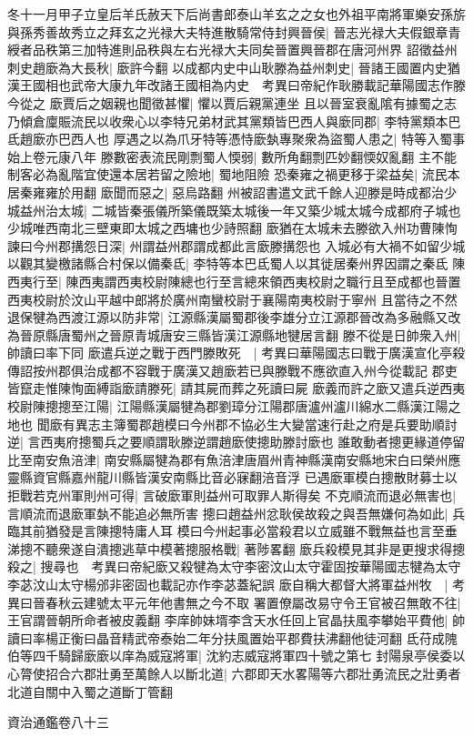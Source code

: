 冬十一月甲子立皇后羊氏赦天下后尚書郎泰山羊玄之之女也外祖平南將軍樂安孫旂與孫秀善故秀立之拜玄之光禄大夫特進散騎常侍封興晉侯|{
	晉志光禄大夫假銀章青綬者品秩第三加特進則品秩與左右光禄大夫同矣晉置興晉郡在唐河州界}
詔徵益州刺史趙廞為大長秋|{
	廞許今翻}
以成都内史中山耿滕為益州刺史|{
	晉諸王國置内史猶漢王國相也武帝大康九年改諸王國相為内史　考異曰帝紀作耿勝載記華陽國志作滕今從之}
廞賈后之姻親也聞徵甚懼|{
	懼以賈后親黨連坐}
且以晉室衰亂隂有據蜀之志乃傾倉廩賑流民以收衆心以李特兄弟材武其黨類皆巴西人與廞同郡|{
	李特黨類本巴氐趙廞亦巴西人也}
厚遇之以為爪牙特等憑恃廞埶專聚衆為盜蜀人患之|{
	特等入蜀事始上卷元康八年}
滕數密表流民剛剽蜀人愞弱|{
	數所角翻剽匹妙翻愞奴亂翻}
主不能制客必為亂階宜使還本居若留之險地|{
	蜀地阻險}
恐秦雍之禍更移于梁益矣|{
	流民本居秦雍雍於用翻}
廞聞而惡之|{
	惡烏路翻}
州被詔書遣文武千餘人迎滕是時成都治少城益州治太城|{
	二城皆秦張儀所築儀既築太城後一年又築少城太城今成都府子城也少城唯西南北三壁東即太城之西墉也少詩照翻}
廞猶在太城未去滕欲入州功曹陳恂諫曰今州郡搆怨日深|{
	州謂益州郡謂成都此言廞滕搆怨也}
入城必有大禍不如留少城以觀其變檄諸縣合村保以備秦氐|{
	李特等本巴氐蜀人以其徙居秦州界因謂之秦氐}
陳西夷行至|{
	陳西夷謂西夷校尉陳總也行至言總來領西夷校尉之職行且至成都也晉置西夷校尉於汶山平越中郎將於廣州南蠻校尉于襄陽南夷校尉于寧州}
且當待之不然退保犍為西渡江源以防非常|{
	江源縣漢屬蜀郡後李雄分立江源郡晉改為多融縣又改為晉原縣唐蜀州之晉原青城唐安三縣皆漢江源縣地犍居言翻}
滕不從是日帥衆入州|{
	帥讀曰率下同}
廞遣兵逆之戰于西門滕敗死　|{
	考異曰華陽國志曰戰于廣漢宣化亭殺傳詔按州郡俱治成都不容戰于廣漢又趙廞若已與滕戰不應欲直入州今從載記}
郡吏皆竄走惟陳恂面縛詣廞請滕死|{
	請其屍而葬之死讀曰屍}
廞義而許之廞又遣兵逆西夷校尉陳摠摠至江陽|{
	江陽縣漢屬犍為郡劉璋分江陽郡唐瀘州瀘川綿水二縣漢江陽之地也}
聞廞有異志主簿蜀郡趙模曰今州郡不協必生大變當速行赴之府是兵要助順討逆|{
	言西夷府摠蜀兵之要順謂耿滕逆謂趙廞使摠助滕討廞也}
誰敢動者摠更緣道停留比至南安魚涪津|{
	南安縣屬犍為郡有魚涪津唐眉州青神縣漢南安縣地宋白曰榮州應靈縣資官縣嘉州龍川縣皆漢安南縣比音必寐翻涪音浮}
已遇廞軍模白摠散財募士以拒戰若克州軍則州可得|{
	言破廞軍則益州可取罪人斯得矣}
不克順流而退必無害也|{
	言順流而退廞軍埶不能追必無所害}
摠曰趙益州忿耿侯故殺之與吾無嫌何為如此|{
	兵臨其前猶發是言陳摠特庸人耳}
模曰今州起事必當殺君以立威雖不戰無益也言至垂涕摠不聽衆遂自潰摠逃草中模著摠服格戰|{
	著陟畧翻}
廞兵殺模見其非是更搜求得摠殺之|{
	搜尋也　考異曰帝紀廞又殺犍為太守李密汶山太守霍固按華陽國志犍為太守李苾汶山太守楊邠非密固也載記亦作李苾蓋紀誤}
廞自稱大都督大將軍益州牧　|{
	考異曰晉春秋云建號太平元年他書無之今不取}
署置僚屬改易守令王官被召無敢不往|{
	王官謂晉朝所命者被皮義翻}
李庠帥妹壻李含天水任回上官晶扶風李攀始平費他|{
	帥讀曰率楊正衡曰晶音精武帝泰始二年分扶風置始平郡費扶沸翻他徒河翻}
氐苻成隗伯等四千騎歸廞廞以庠為威寇將軍|{
	沈約志威寇將軍四十號之第七}
封陽泉亭侯委以心膂使招合六郡壯勇至萬餘人以斷北道|{
	六郡即天水畧陽等六郡壯勇流民之壯勇者北道自關中入蜀之道斷丁管翻}


資治通鑑卷八十三
